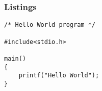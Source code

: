 \documentclass[aspectratio=43]{beamer}
\begin{document}
\begin{frame}[fragile]
\frametitle{Listings}
\begin{lstlisting}[style=CStyle]
/* Hello World program */

#include<stdio.h>

main()
{
    printf("Hello World");
}
\end{lstlisting}
\end{frame}
\end{document}
